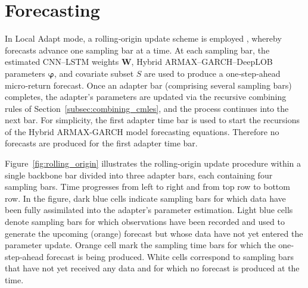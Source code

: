 \documentclass{rQUF2e}
\newcommand{\Prob}{\mathbb{P}}
\theoremstyle{plain}
\theoremstyle{definition}
\theoremstyle{remark}
\DeclarePairedDelimiter{\aval}{\lvert}{\rvert} %
\begin{document}



\section{Forecasting}
\label{sec:forecasting}

In Local Adapt mode, a rolling‐origin update scheme is employed \citep{meisenbacher2022review}, whereby forecasts advance one sampling bar at a time.  At each sampling bar, the estimated CNN–LSTM weights \(\mathbf{W}\), Hybrid ARMAX–GARCH–DeepLOB parameters \(\boldsymbol{\varphi}\), and covariate subset \(S\) are used to produce a one‐step‐ahead micro‐return forecast.  Once an adapter bar (comprising several sampling bars) completes, the adapter’s parameters are updated via the recursive combining rules of Section~\ref{subsec:combining_cmles}, and the process continues into the next bar. For simplicity, the first adapter time bar is used to start the recursions of the Hybrid ARMAX-GARCH model forecasting equations. Therefore no forecasts are produced for the first adapter time bar.

Figure~\ref{fig:rolling_origin} illustrates the rolling-origin update procedure within a single backbone bar divided into three adapter bars, each containing four sampling bars. Time progresses from left to right and from top row to bottom row. In the figure, dark blue cells indicate sampling bars for which data have been fully assimilated into the adapter’s parameter estimation. Light blue cells denote sampling bars for which observations have been recorded and used to generate the upcoming (orange) forecast but whose data have not yet entered the parameter update. Orange cell mark the sampling time bars for which the one‐step‐ahead forecast is being produced. White cells correspond to sampling bars that have not yet received any data and for which no forecast is produced at the time.
\end{document}
